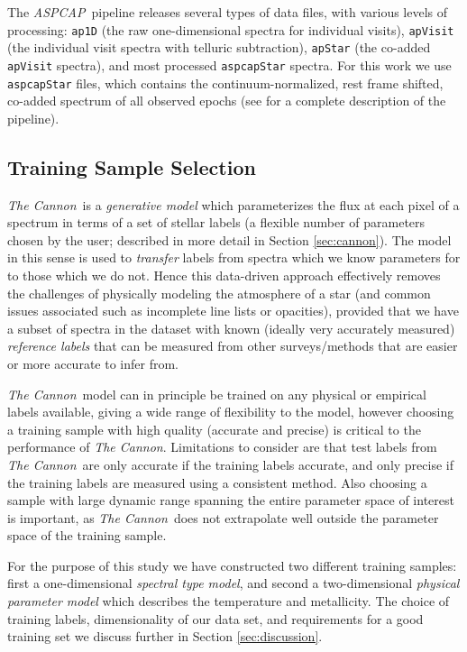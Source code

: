 \documentclass[modern]{aastex62}
\newcommand{\thecannon}{\textsl{The Cannon}}
\newcommand{\aspcap}{\textsl{ASPCAP}}
\begin{document}
The \aspcap\ pipeline releases several types of data files, with various levels of processing: {\tt\string ap1D} (the raw one-dimensional spectra for individual visits), {\tt\string apVisit} (the individual visit spectra with telluric subtraction), {\tt\string apStar} (the co-added {\tt\string apVisit} spectra), and most processed {\tt\string aspcapStar} spectra. For this work we use {\tt\string aspcapStar} files, which contains the continuum-normalized, rest frame shifted, co-added spectrum of all observed epochs (see \citealt{Perez:2016} for a complete description of the pipeline). \color{gcolor}{HOGG: do you want to comment on continuum normalization issues?}\color{black}
 
\subsection{Training Sample Selection}

\thecannon\ is a \emph{generative model} which parameterizes the flux at each pixel of a spectrum in terms of a set of stellar labels (a flexible number of parameters chosen by the user; described in more detail in Section \ref{sec:cannon}). The model in this sense is used to \emph{transfer} labels from spectra which we know parameters for to those which we do not. Hence this data-driven approach effectively removes the challenges of physically modeling the atmosphere of a star (and common issues associated such as incomplete line lists or opacities), provided that we have a subset of spectra in the dataset with known (ideally very accurately measured) \emph{reference labels} that can be measured from other surveys/methods that are easier or more accurate to infer from. 

\thecannon\ model can in principle be trained on any physical or empirical labels available, giving a wide range of flexibility to the model, however choosing a training sample with high quality (accurate and precise) is critical to the performance of \thecannon. Limitations to consider are that test labels from \thecannon\ are only accurate if the training labels accurate, and only precise if the training labels are measured using a consistent method. Also choosing a sample with large dynamic range spanning the entire parameter space of interest is important, as \thecannon\ does not extrapolate well outside the parameter space of the training sample.
\color{gcolor}{HOGG: More notes to add here?}\color{black}

For the purpose of this study we have constructed two different training samples: first a one-dimensional \emph{spectral type model}, and second a two-dimensional \emph{physical parameter model} which describes the temperature and metallicity. The choice of training labels, dimensionality of our data set, and requirements for a good training set we discuss further in Section \ref{sec:discussion}.
\end{document}

